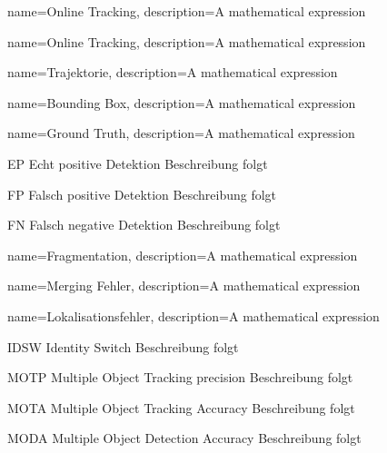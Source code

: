 {
        name=Online Tracking,
        description={A mathematical expression}
}

{
        name=Online Tracking,
        description={A mathematical expression}
}

{
        name=Trajektorie,
        description={A mathematical expression}
}

{
        name=Bounding Box,
        description={A mathematical expression}
}

{
        name=Ground Truth,
        description={A mathematical expression}
}



\newglossaryentrywithacronym
{EP}
{Echt positive Detektion}
{Beschreibung folgt}

\newglossaryentrywithacronym
{FP}
{Falsch positive Detektion}
{Beschreibung folgt}

\newglossaryentrywithacronym
{FN}
{Falsch negative Detektion}
{Beschreibung folgt}

{
        name=Fragmentation,
        description={A mathematical expression}
}

{
        name=Merging Fehler,
        description={A mathematical expression}
}

{
        name=Lokalisationsfehler,
        description={A mathematical expression}
}

\newglossaryentrywithacronym
{IDSW}
{Identity Switch}
{Beschreibung folgt}


\newglossaryentrywithacronym
{MOTP}
{Multiple Object Tracking precision}
{Beschreibung folgt}

\newglossaryentrywithacronym
{MOTA}
{Multiple Object Tracking Accuracy}
{Beschreibung folgt}

\newglossaryentrywithacronym
{MODA}
{Multiple Object Detection Accuracy}
{Beschreibung folgt}


